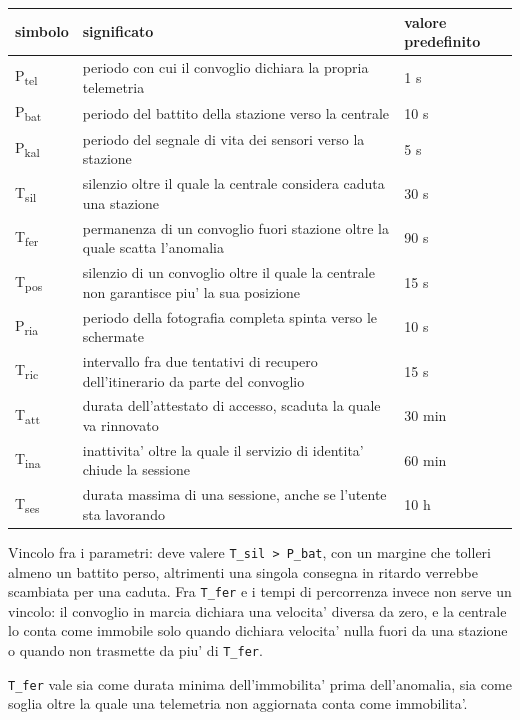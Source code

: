 \documentclass[11pt]{article}
\begin{document}
\begin{center}
\begin{tabular}{|p{}|p{}|p{}|}
simbolo & significato & valore predefinito\\
\hline
P\textsubscript{tel} & periodo con cui il convoglio dichiara la propria telemetria & 1 s\\
P\textsubscript{bat} & periodo del battito della stazione verso la centrale & 10 s\\
P\textsubscript{kal} & periodo del segnale di vita dei sensori verso la stazione & 5 s\\
T\textsubscript{sil} & silenzio oltre il quale la centrale considera caduta una stazione & 30 s\\
T\textsubscript{fer} & permanenza di un convoglio fuori stazione oltre la quale scatta l'anomalia & 90 s\\
T\textsubscript{pos} & silenzio di un convoglio oltre il quale la centrale non garantisce piu' la sua posizione & 15 s\\
P\textsubscript{ria} & periodo della fotografia completa spinta verso le schermate & 10 s\\
T\textsubscript{ric} & intervallo fra due tentativi di recupero dell'itinerario da parte del convoglio & 15 s\\
T\textsubscript{att} & durata dell'attestato di accesso, scaduta la quale va rinnovato & 30 min\\
T\textsubscript{ina} & inattivita' oltre la quale il servizio di identita' chiude la sessione & 60 min\\
T\textsubscript{ses} & durata massima di una sessione, anche se l'utente sta lavorando & 10 h\\
\end{tabular}
\end{center}

Vincolo fra i parametri: deve valere \texttt{T\_sil > P\_bat}, con un margine che tolleri almeno un battito
perso, altrimenti una singola consegna in ritardo verrebbe scambiata per una caduta. Fra \texttt{T\_fer} e
i tempi di percorrenza invece non serve un vincolo: il convoglio in marcia dichiara una velocita'
diversa da zero, e la centrale lo conta come immobile solo quando dichiara velocita' nulla fuori da
una stazione o quando non trasmette da piu' di \texttt{T\_fer}.

\texttt{T\_fer} vale sia come durata minima dell'immobilita' prima dell'anomalia, sia come soglia oltre la
quale una telemetria non aggiornata conta come immobilita'.
\end{document}
